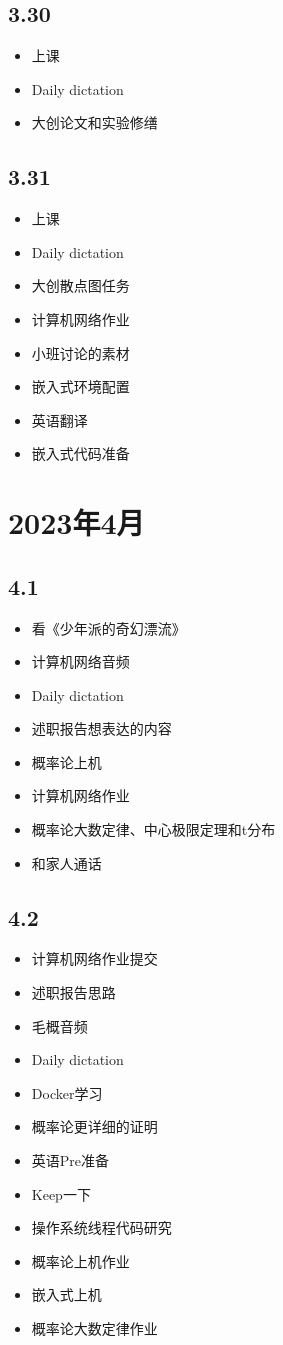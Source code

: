 \documentclass[UTF8]{ctexart}
\begin{document}
\subsection*{3.30}
\begin{itemize}
    \item 上课
    \item Daily dictation
    \item 大创论文和实验修缮
\end{itemize}
\subsection*{3.31}
\begin{itemize}
    \item 上课
    \item Daily dictation
    \item 大创散点图任务
    \item 计算机网络作业
    \item 小班讨论的素材
    \item 嵌入式环境配置
    \item 英语翻译
    \item 嵌入式代码准备
\end{itemize}
\section*{2023年4月}
\subsection*{4.1}
\begin{itemize}
    \item 看《少年派的奇幻漂流》
    \item 计算机网络音频
    \item Daily dictation
    \item 述职报告想表达的内容
    \item 概率论上机
    \item 计算机网络作业
    \item 概率论大数定律、中心极限定理和t分布
    \item 和家人通话
\end{itemize}
\subsection*{4.2}
\begin{itemize}
    \item 计算机网络作业提交
    \item 述职报告思路
    \item 毛概音频
    \item Daily dictation
    \item Docker学习
    \item 概率论更详细的证明
    \item 英语Pre准备
    \item Keep一下
    \item 操作系统线程代码研究
    \item 概率论上机作业
    \item 嵌入式上机
    \item 概率论大数定律作业
\end{itemize}
\end{document}
